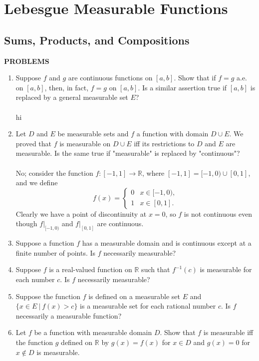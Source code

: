 \chapter{Lebesgue Measurable Functions}

\section{Sums, Products, and Compositions}
\begin{center}
	\textbf{PROBLEMS}
\end{center}
\begin{enumerate}
	\setcounter{enumi}{0}
	\item Suppose $f$ and $g$ are continuous functions on $[a,b]$. Show that if $f=g$ a.e. on $[a,b]$, then, in fact, $f=g$ on $[a,b]$.
    Is a similar assertion true if $[a,b]$ is replaced by a general measurable set $E$?\\
    \\hi
    \item Let $D$ and $E$ be measurable sets and $f$ a function with domain $D\cup E$. We proved that $f$ is measurable on $D\cup E$ iff its restrictions to $D$ and $E$ are measurable.
    Is the same true if "measurable" is replaced by "continuous"?\\
    \\No; consider the function $f:[-1,1]\to\mathbb{R}$, where $[-1,1]=[-1,0)\cup[0,1]$, and we define
    \[
    f(x)=
    \begin{cases}
        0&x\in[-1,0),\\
        1&x\in[0,1].
    \end{cases}    
    \]
    Clearly we have a point of discontinuity at $x=0$, so $f$ is not continuous even though $f|_{[-1,0)}$ and $f|_{[0,1]}$ are continuous.
    \item Suppose a function $f$ has a measurable domain and is continuous except at a finite number of points.
    Is $f$ necessarily measurable?
    \item Suppose $f$ is a real-valued function on $\mathbb{R}$ such that $f^{-1}(c)$ is measurable for each number $c$. Is $f$ necessarily measurable?
    \item Suppose the function $f$ is defined on a measurable set $E$ and $\{x\in E\ |\ f(x)>c\}$ is a measurable set for each rational number $c$. Is $f$ necessarily a measurable function?
    \item Let $f$ be a function with measurable domain $D$. Show that $f$ is measurable iff the function $g$ defined on $\mathbb{R}$ by $g(x)=f(x)$ for $x\in D$ and $g(x)=0$ for $x\notin D$ is measurable.

\end{enumerate}
